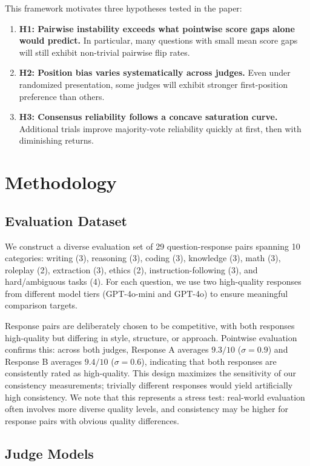 \documentclass{ijclclp}
\begin{document}
This framework motivates three hypotheses tested in the paper:
\begin{enumerate}[nosep]
    \item \textbf{H1: Pairwise instability exceeds what pointwise score gaps alone would predict.} In particular, many questions with small mean score gaps will still exhibit non-trivial pairwise flip rates.
    \item \textbf{H2: Position bias varies systematically across judges.} Even under randomized presentation, some judges will exhibit stronger first-position preference than others.
    \item \textbf{H3: Consensus reliability follows a concave saturation curve.} Additional trials improve majority-vote reliability quickly at first, then with diminishing returns.
\end{enumerate}

\section{Methodology}

\subsection{Evaluation Dataset}

We construct a diverse evaluation set of 29 question-response pairs spanning 10 categories: writing (3), reasoning (3), coding (3), knowledge (3), math (3), roleplay (2), extraction (3), ethics (2), instruction-following (3), and hard/ambiguous tasks (4). For each question, we use two high-quality responses from different model tiers (GPT-4o-mini and GPT-4o) to ensure meaningful comparison targets.

Response pairs are deliberately chosen to be competitive, with both responses high-quality but differing in style, structure, or approach. Pointwise evaluation confirms this: across both judges, Response A averages $9.3/10$ ($\sigma = 0.9$) and Response B averages $9.4/10$ ($\sigma = 0.6$), indicating that both responses are consistently rated as high-quality. This design maximizes the sensitivity of our consistency measurements; trivially different responses would yield artificially high consistency. We note that this represents a stress test: real-world evaluation often involves more diverse quality levels, and consistency may be higher for response pairs with obvious quality differences.

\subsection{Judge Models}
\end{document}
